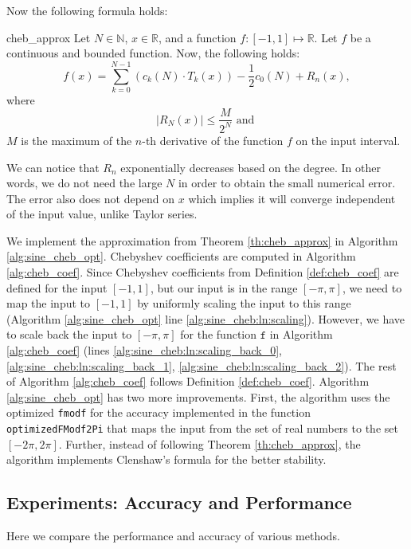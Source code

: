 \documentclass[12pt]{article}
\begin{document}
Now the following formula holds:
\begin{TheoremColor}{
}{cheb_approx}
    Let $N \in \mathbb{N}$, $x \in \mathbb{R}$, and a function $f : [-1, 1] \mapsto \mathbb{R}$.
    Let $f$ be a continuous and bounded function. Now, the following holds:
    \begin{equation*}
        f(x) = \sum_{k=0}^{N-1} \left(c_k(N) \cdot T_k(x)\right) - \frac{1}{2} c_0(N) + R_n(x),
    \end{equation*}
    where
    \begin{equation*}
        \left| R_N(x) \right| \leq \frac{M}{2^N} \text{ and }
    \end{equation*}
    $M$ is the maximum of the $n$-th derivative of the function $f$ on the input interval.
\end{TheoremColor}
We can notice that $R_n$ exponentially decreases based on the degree.
In other words, we do not need the large $N$ in order to obtain the small numerical error.
The error also does not depend on $x$ which implies it will converge independent of the input value, unlike Taylor series.

We implement the approximation from Theorem \ref{th:cheb_approx} in Algorithm \ref{alg:sine_cheb_opt}.
Chebyshev coefficients are computed in Algorithm \ref{alg:cheb_coef}.
Since Chebyshev coefficients from Definition \ref{def:cheb_coef} are defined for the input $[-1, 1]$, but our input is in the range $[-\pi, \pi]$, we need to map the input to $[-1, 1]$ by uniformly scaling the input to this range (Algorithm \ref{alg:sine_cheb_opt} line \ref{alg:sine_cheb:ln:scaling}).
However, we have to scale back the input to $[-\pi, \pi]$ for the function $\texttt{f}$ in Algorithm \ref{alg:cheb_coef} (lines \ref{alg:sine_cheb:ln:scaling_back_0}, \ref{alg:sine_cheb:ln:scaling_back_1}, \ref{alg:sine_cheb:ln:scaling_back_2}).
The rest of Algorithm \ref{alg:cheb_coef} follows Definition \ref{def:cheb_coef}.
Algorithm \ref{alg:sine_cheb_opt} has two more improvements.
First, the algorithm uses the optimized \texttt{fmodf} for the accuracy implemented in the function \texttt{optimizedFModf2Pi} that maps the input from the set of real numbers to the set $[-2 \pi, 2 \pi]$.
Further, instead of following Theorem \ref{th:cheb_approx}, the algorithm implements Clenshaw's formula \cite[p~.237]{press2007numerical} for the better stability.


\newpage
\subsection{Experiments: Accuracy and Performance}
Here we compare the performance and accuracy of various methods.
\end{document}
